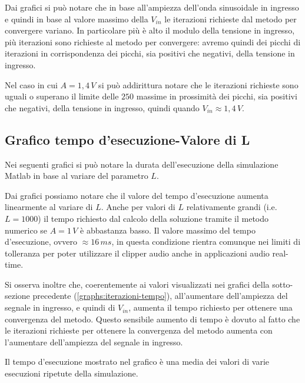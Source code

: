 			\graficospace
			\graficospace
			\graficospace
			\graficospace
			
			Dai grafici si può notare che in base all'ampiezza dell'onda sinusoidale in ingresso e quindi in base al valore massimo della $V_{in}$ le iterazioni richieste dal metodo per convergere variano. In particolare più è alto il modulo della tensione in ingresso, più iterazioni sono richieste al metodo per convergere: avremo quindi dei picchi di iterazioni in corrispondenza dei picchi, sia positivi che negativi, della tensione in ingresso.
			
			Nel caso in cui $A = 1,4\,V$ si può addirittura notare che le iterazioni richieste sono uguali o superano il limite delle $250$ massime in prossimità dei picchi, sia positivi che negativi, della tensione in ingresso, quindi quando $V_{in} \approx 1,4\,V$.
			\pagebreak
		
		\subsection{Grafico tempo d'esecuzione-Valore di L}
			Nei seguenti grafici si può notare la durata dell'esecuzione della simulazione Matlab in base al variare del parametro $L$.
			\graficospace
			\graficospace
			
			Dai grafici possiamo notare che il valore del tempo d'esecuzione aumenta linearmente al variare di $L$. Anche per valori di $L$ relativamente grandi (i.e. $L = 1000$) il tempo richiesto dal calcolo della soluzione tramite il metodo numerico se $A = 1\,V$ è abbastanza basso. Il valore massimo del tempo d'esecuzione, ovvero $\approx 16\,ms$, in questa condizione rientra comunque nei limiti di tolleranza per poter utilizzare il clipper audio anche in applicazioni audio real-time.
			
			Si osserva inoltre che, coerentemente ai valori visualizzati nei grafici della sotto-sezione precedente (\ref{graphs:iterazioni-tempo}), all'aumentare dell'ampiezza del segnale in ingresso, e quindi di $V_{in}$, aumenta il tempo richiesto per ottenere una convergenza del metodo. Questo sensibile aumento di tempo è dovuto al fatto che le iterazioni richieste per ottenere la convergenza del metodo aumenta con l'aumentare dell'ampiezza del segnale in ingresso.
			
			Il tempo d'esecuzione mostrato nel grafico è una media dei valori di varie esecuzioni ripetute della simulazione.